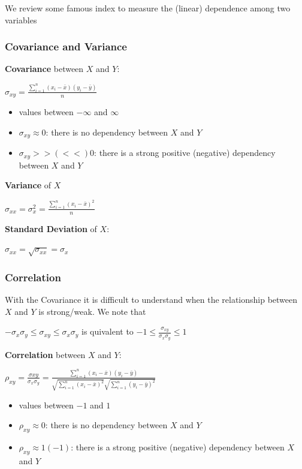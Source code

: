 \documentclass[
]{article}
\providecommand{\tightlist}{%
  \setlength{\itemsep}{0pt}\setlength{\parskip}{0pt}}
\begin{document}
We review some famous index to measure the (linear) dependence among two
variables

\hypertarget{covariance-and-variance}{%
\subsubsection{Covariance and Variance}\label{covariance-and-variance}}

\textbf{Covariance} between \(X\) and \(Y\):

\(\sigma_{xy}=\frac{\sum_{i=1} ^ n (x_i- \bar{x}) (y_i- \bar{y} )}{n}\)

\begin{itemize}
\tightlist
\item
  values between \(- \infty\) and \(\infty\)\\
\item
  \(\sigma_{xy} \approx 0\): there is no dependency between \(X\) and
  \(Y\)\\
\item
  \(\sigma_{xy} >> (<<) 0\): there is a strong positive (negative)
  dependency between \(X\) and \(Y\)
\end{itemize}

\textbf{Variance} of \(X\)

\(\sigma_{xx}=\sigma_{x} ^ 2= \frac{\sum_{i=1} ^ n (x_i- \bar{x}) ^ 2}{n}\)

\textbf{Standard Deviation} of \(X\):

\(\sigma_{xx}=\sqrt{\sigma_{xx}}=\sigma_{x}\)

\hypertarget{correlation}{%
\subsubsection{Correlation}\label{correlation}}

With the Covariance it is difficult to understand when the relationship
between \(X\) and \(Y\) is strong/weak. We note that

\(- \sigma_{x} \sigma_{y} \leq \sigma_{xy} \leq \sigma_{x} \sigma_{y}\)
is quivalent to
\(-1 \leq \frac{\sigma_{xy}}{\sigma_{x} \sigma_{y}} \leq 1\)

\textbf{Correlation} between \(X\) and \(Y\):

\(\rho_{xy}=\frac{\sigma{xy}}{\sigma_{x} \sigma_{y}} = \frac{\sum_{i=1} ^ n (x_i- \bar{x}) (y_i- \bar{y})}{\sqrt{\sum_{i=1} ^ n (x_i- \bar{ x}) ^ 2} \sqrt{\sum_{i=1} ^ n (y_i- \bar{y}) ^ 2}}\)

\begin{itemize}
\tightlist
\item
  values between \(-1\) and \(1\)
\item
  \(\rho_{xy} \approx 0\): there is no dependency between \(X\) and
  \(Y\)
\item
  \(\rho_{xy} \approx 1 (-1)\): there is a strong positive (negative)
  dependency between \(X\) and \(Y\)
\end{itemize}
\end{document}
